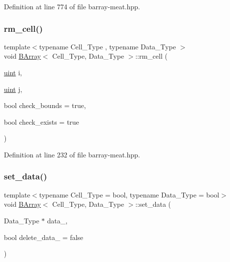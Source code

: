 Definition at line 774 of file barray-\/meat.\+hpp.

\mbox{\label{class_b_array_aaead894ff275479db4f733793ce037db}} 
\subsubsection{\texorpdfstring{rm\+\_\+cell()}{rm\_cell()}}
{\footnotesize\ttfamily template$<$typename Cell\+\_\+\+Type , typename Data\+\_\+\+Type $>$ \\
void \hyperlink{class_b_array}{B\+Array}$<$ Cell\+\_\+\+Type, Data\+\_\+\+Type $>$\+::rm\+\_\+cell (\begin{DoxyParamCaption}\item[{\hyperlink{typedefs_8hpp_a91ad9478d81a7aaf2593e8d9c3d06a14}{uint}}]{i,  }\item[{\hyperlink{typedefs_8hpp_a91ad9478d81a7aaf2593e8d9c3d06a14}{uint}}]{j,  }\item[{bool}]{check\+\_\+bounds = {\ttfamily true},  }\item[{bool}]{check\+\_\+exists = {\ttfamily true} }\end{DoxyParamCaption})\hspace{0.3cm}{\ttfamily [inline]}}



Definition at line 232 of file barray-\/meat.\+hpp.

\mbox{\label{class_b_array_accf44b49caa7746a462a3ac9b6024cfc}} 
\subsubsection{\texorpdfstring{set\+\_\+data()}{set\_data()}}
{\footnotesize\ttfamily template$<$typename Cell\+\_\+\+Type = bool, typename Data\+\_\+\+Type = bool$>$ \\
void \hyperlink{class_b_array}{B\+Array}$<$ Cell\+\_\+\+Type, Data\+\_\+\+Type $>$\+::set\+\_\+data (\begin{DoxyParamCaption}\item[{Data\+\_\+\+Type $\ast$}]{data\+\_\+,  }\item[{bool}]{delete\+\_\+data\+\_\+ = {\ttfamily false} }\end{DoxyParamCaption})\hspace{0.3cm}{\ttfamily [inline]}}



